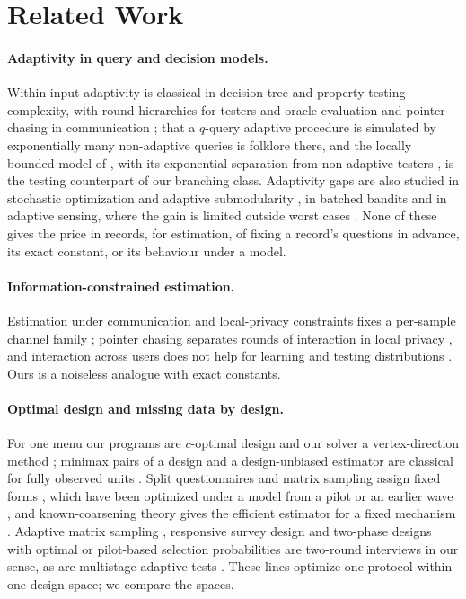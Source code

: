 \documentclass{article}
\begin{document}
\section{Related Work}\label{sec:related}
\paragraph{Adaptivity in query and decision models.} Within-input adaptivity is classical in decision-tree and property-testing complexity, with round hierarchies for testers and oracle evaluation \citep{canonne2018,li2026regex} and pointer chasing in communication \citep{nisan1993}; that a $q$-query adaptive procedure is simulated by exponentially many non-adaptive queries is folklore there, and the locally bounded model of \citet{adar2024}, with its exponential separation from non-adaptive testers \citep{goldreich2022,chakraborty2023}, is the testing counterpart of our branching class. Adaptivity gaps are also studied in stochastic optimization and adaptive submodularity \citep{dean2008,golovin2011}, in batched bandits \citep{perchet2016,gao2019} and in adaptive sensing, where the gain is limited outside worst cases \citep{ariascastro2013}. None of these gives the price in records, for estimation, of fixing a record's questions in advance, its exact constant, or its behaviour under a model.

\paragraph{Information-constrained estimation.} Estimation under communication and local-privacy constraints fixes a per-sample channel family \citep{acharya2019,barnes2020}; pointer chasing separates rounds of interaction in local privacy \citep{joseph2019,joseph2020}, and interaction across users does not help for learning and testing distributions \citep{acharya2022tit,lau2026}. Ours is a noiseless analogue with exact constants.

\paragraph{Optimal design and missing data by design.} For one menu our programs are $c$-optimal design and our solver a vertex-direction method \citep{elfving1952,fedorov1972,wynn1970,pukelsheim1993,sagnol2011}; minimax pairs of a design and a design-unbiased estimator are classical for fully observed units \citep{stenger1979,gabler1990,aronow2026}. Split questionnaires and matrix sampling assign fixed forms \citep{raghunathan1995,graham2006,thomas2006,chipperfield2009,rhemtulla2012}, which have been optimized under a model from a pilot or an earlier wave \citep{adiguzel2008,jang2022}, and known-coarsening theory gives the efficient estimator for a fixed mechanism \citep{robins1994,tsiatis2006}. Adaptive matrix sampling \citep{gonzalez2008}, responsive survey design \citep{groves2006} and two-phase designs with optimal or pilot-based selection probabilities \citep{reilly1995,gilbert2014,mcisaac2015,tao2020,chen2020,chen2022} are two-round interviews in our sense, as are multistage adaptive tests \citep{yamamoto2018,fink2024}. These lines optimize one protocol within one design space; we compare the spaces.
\end{document}
